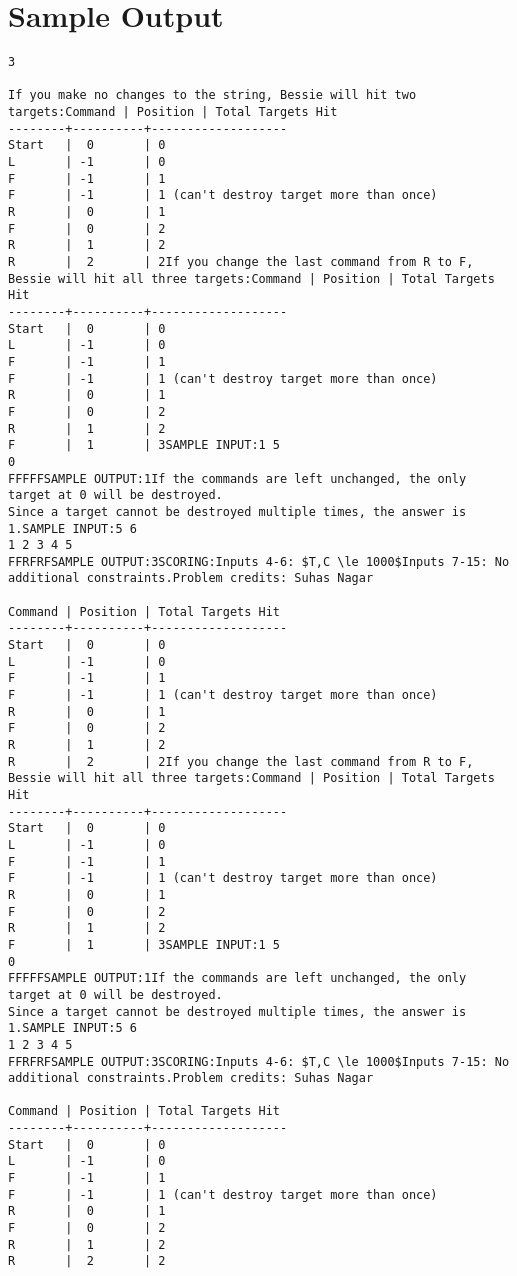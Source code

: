 \documentclass[12pt]{article}
\begin{document}
\section*{Sample Output}
\begin{verbatim}
3

If you make no changes to the string, Bessie will hit two targets:Command | Position | Total Targets Hit
--------+----------+-------------------
Start   |  0       | 0 
L       | -1       | 0
F       | -1       | 1
F       | -1       | 1 (can't destroy target more than once)
R       |  0       | 1
F       |  0       | 2
R       |  1       | 2
R       |  2       | 2If you change the last command from R to F, Bessie will hit all three targets:Command | Position | Total Targets Hit
--------+----------+-------------------
Start   |  0       | 0 
L       | -1       | 0
F       | -1       | 1
F       | -1       | 1 (can't destroy target more than once)
R       |  0       | 1
F       |  0       | 2
R       |  1       | 2
F       |  1       | 3SAMPLE INPUT:1 5
0
FFFFFSAMPLE OUTPUT:1If the commands are left unchanged, the only target at 0 will be destroyed.
Since a target cannot be destroyed multiple times, the answer is 1.SAMPLE INPUT:5 6
1 2 3 4 5
FFRFRFSAMPLE OUTPUT:3SCORING:Inputs 4-6: $T,C \le 1000$Inputs 7-15: No additional constraints.Problem credits: Suhas Nagar

Command | Position | Total Targets Hit
--------+----------+-------------------
Start   |  0       | 0 
L       | -1       | 0
F       | -1       | 1
F       | -1       | 1 (can't destroy target more than once)
R       |  0       | 1
F       |  0       | 2
R       |  1       | 2
R       |  2       | 2If you change the last command from R to F, Bessie will hit all three targets:Command | Position | Total Targets Hit
--------+----------+-------------------
Start   |  0       | 0 
L       | -1       | 0
F       | -1       | 1
F       | -1       | 1 (can't destroy target more than once)
R       |  0       | 1
F       |  0       | 2
R       |  1       | 2
F       |  1       | 3SAMPLE INPUT:1 5
0
FFFFFSAMPLE OUTPUT:1If the commands are left unchanged, the only target at 0 will be destroyed.
Since a target cannot be destroyed multiple times, the answer is 1.SAMPLE INPUT:5 6
1 2 3 4 5
FFRFRFSAMPLE OUTPUT:3SCORING:Inputs 4-6: $T,C \le 1000$Inputs 7-15: No additional constraints.Problem credits: Suhas Nagar

Command | Position | Total Targets Hit
--------+----------+-------------------
Start   |  0       | 0 
L       | -1       | 0
F       | -1       | 1
F       | -1       | 1 (can't destroy target more than once)
R       |  0       | 1
F       |  0       | 2
R       |  1       | 2
R       |  2       | 2


\end{verbatim}
\end{document}
